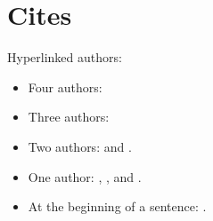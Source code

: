 \documentclass[english]{scrbook}
\begin{document}
\chapter{Cites}
Hyperlinked authors:

\begin{itemize}
  \item Four authors: \citeauthor{ABCD02} \cite{ABCD02}
  \item Three authors: \citeauthor{ABC01} \cite{ABC01}
  \item Two authors: \citeauthor{AB00} \cite{AB00} and \citeauthor{vdAW2013} \cite{vdAW2013}.
  \item One author: \citeauthor{Ez10} \cite{Ez10}, \citeauthor{Go10} \cite{Go10}, and \citeauthor{latexcookbook} \cite{latexcookbook}.
  \item At the beginning of a sentence: .
\end{itemize}

\nocite{*}
\printbibliography
\end{document}
